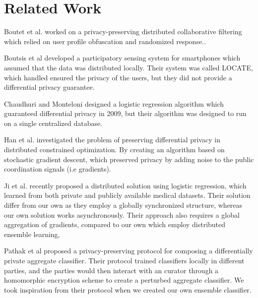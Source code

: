 
\section{Related Work}

Boutet et al. worked on a privacy-preserving distributed collaborative filtering which relied on user profile obfuscation and randomized response.\cite{boutet2013DisCollFil}.

Boutsis et al developed a participatory sensing system for smartphones which assumed that the data was distributed locally. Their system was called LOCATE, which handled ensured the privacy of the users, but they did not provide a differential privacy guarantee. \cite{boutsis2013}

Chaudhuri and Monteloni designed a logistic regression algorithm which guaranteed differential privacy in 2009, but their algorithm was designed to run on a single centralized database\cite{chaudhuri2009logistic}.

Han et al. investigated the problem of preserving differential privacy in distributed constrained optimization. By creating an algorithm based on stochastic gradient descent, which preserved privacy by adding noise to the public coordination signals (i.e gradients). \cite{han2014disOptimization}

Ji et al. \cite{ji2014DisLogReg} recently proposed a distributed solution using logistic regression, which learned from both private and publicly available medical datasets. Their solution differ from our own as they employ a globally synchronized structure, whereas our own solution works asynchronously. Their approach also requires a global aggregation of gradients, compared to our own which employ distributed ensemble learning,

Pathak et al \cite{pathak2010diffprivhomo} proposed a privacy-preserving protocol for composing a differentially private aggregate classifier. Their protocol trained classifiers locally in different parties, and the parties would then interact with an curator through a homomorphic encryption scheme to create a perturbed aggregate classifier. We took inspiration from their protocol when we created our own ensemble classifier.



